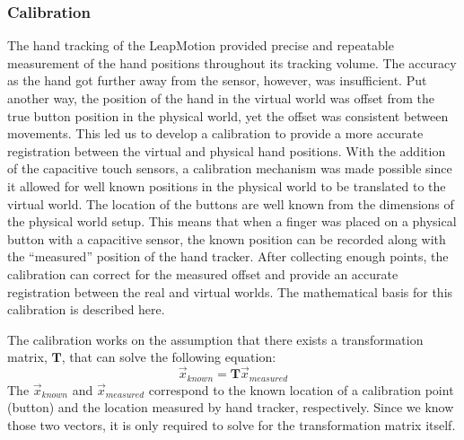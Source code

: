 \subsubsection{Calibration}

The hand tracking of the LeapMotion provided precise and repeatable measurement of the hand positions throughout its tracking volume.
The accuracy as the hand got further away from the sensor, however, was insufficient.
Put another way, the position of the hand in the virtual world was offset from the true button position in the physical world, yet the offset was consistent between movements.
This led us to develop a calibration to provide a more accurate registration between the virtual and physical hand positions.
With the addition of the capacitive touch sensors, a calibration mechanism was made possible since it allowed for well known positions in the physical world to be translated to the virtual world.
The location of the buttons are well known from the dimensions of the physical world setup.
This means that when a finger was placed on a physical button with a capacitive sensor, the known position can be recorded along with the ``measured'' position of the hand tracker.
After collecting enough points, the calibration can correct for the measured offset and provide an accurate registration between the real and virtual worlds.
The mathematical basis for this calibration is described here.

The calibration works on the assumption that there exists a transformation matrix, $\mathbf{T}$, that can solve the following equation:
\begin{equation}
    \vec{x}_{known} = \mathbf{T}\vec{x}_{measured}
    \label{eq:proto_Tvec}
\end{equation}
The $\vec{x}_{known}$ and $\vec{x}_{measured}$ correspond to the known location of a calibration point (button) and the location measured by hand tracker, respectively.
Since we know those two vectors, it is only required to solve for the transformation matrix itself.

